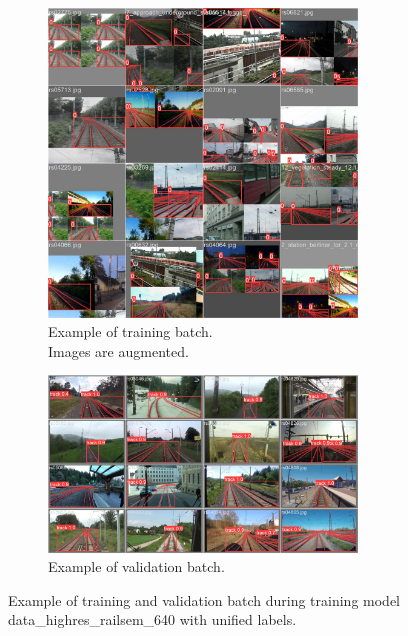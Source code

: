 \documentclass[Master,MDS,english]{BASE/twbook} %
\begin{document}
\begin{figure}
\centering
\begin{subfigure}[t]{.5\textwidth}
  \centering
  \includegraphics[width=0.9\textwidth]{images/yolo/highres/train_batch0}
  \caption{Example of training batch.\\ Images are augmented.}
  \label{fig:mosaic_augmentation_highres}
\end{subfigure}%
\begin{subfigure}[t]{.5\textwidth}
  \centering
  \includegraphics[width=0.9\textwidth]{images/yolo/highres/val_batch1_pred}
  \caption{Example of validation batch. }
\end{subfigure}
\caption{Example of training and validation batch during training model data\_highres\_railsem\_640 with unified labels.}
\label{fig:yolo_highres_example}
\end{figure}
\end{document}
